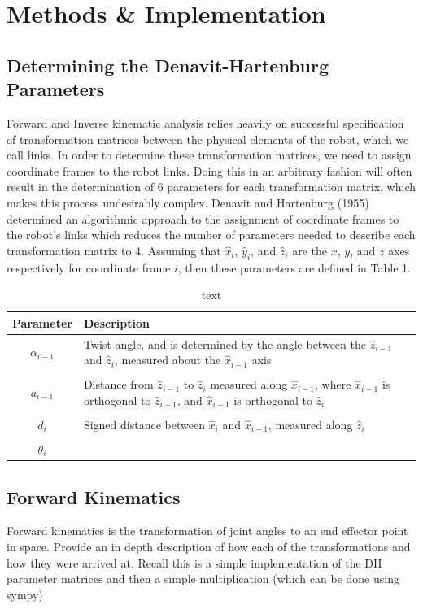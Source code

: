 \documentclass[a4paper]{article}
\begin{document}
\section{Methods \& Implementation}

\subsection{Determining the Denavit-Hartenburg Parameters}
Forward and Inverse kinematic analysis relies heavily on successful specification of transformation matrices between the physical elements of the robot, which we call links. In order to determine these transformation matrices, we need to assign coordinate frames to the robot links. Doing this in an arbitrary fashion will often result in the determination of 6 parameters for each transformation matrix, which makes this process undesirably complex. Denavit and Hartenburg (1955) determined an algorithmic approach to the assignment of coordinate frames to the robot's links which reduces the number of parameters needed to describe each transformation matrix to 4. Assuming that $\hat{x}_i$, $\hat{y}_i$, and $\hat{z}_i$ are the $x$, $y$, and $z$ axes respectively for coordinate frame $i$, then these parameters are defined in Table 1.

\begin{table}[h]
\centering
\caption{text}
\begin{tabular}{cp{8cm}}
\toprule
\textbf{Parameter} & \textbf{Description}\\
\midrule
$\alpha_{i-1}$ & Twist angle, and is determined by the angle between the $\hat{z}_{i-1}$ and $\hat{z}_i$, measured about the $\hat{x}_{i-1}$ axis\\
 & \\
$a_{i-1}$ & Distance from $\hat{z}_{i-1}$ to $\hat{z}_i$ measured along $\hat{x}_{i-1}$, where $\hat{x}_{i-1}$ is orthogonal to $\hat{z}_{i-1}$, and $\hat{x}_{i-1}$ is orthogonal to $\hat{z}_i$\\
 & \\
$d_i$ & Signed distance between $\hat{x}_i$ and $\hat{x}_{i-1}$, measured along $\hat{z}_i$\\
 & \\
$\theta_i$ & \\
\bottomrule
\end{tabular}
\end{table}
  
\subsection{Forward Kinematics}
Forward kinematics is the transformation of joint angles to an end effector point in space. Provide an in depth description of how each of the transformations and how they were arrived at. Recall this is a simple implementation of the DH parameter matrices and then a simple multiplication (which can be done using sympy)
\end{document}
